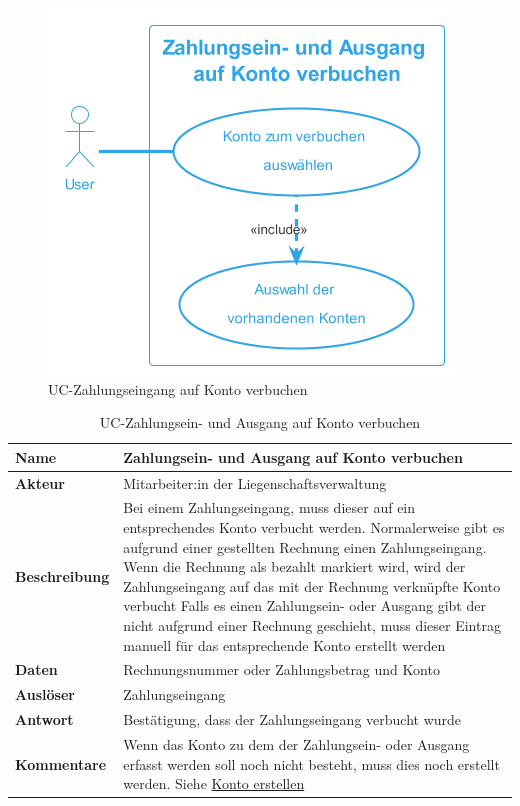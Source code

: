 \begin{figure}[H]
  \begin{center}
      \includegraphics[width=0.5\linewidth]{content/diagrams/out/usecase/verbuchenAufKonto/ZahlungseingangaufKontoverbuchen.png}
    \caption{UC-Zahlungseingang auf Konto verbuchen}
    \label{ZahlungaufKonto}
  \end{center}
\end{figure}

\begin{table}[H]
  \centering
  \settowidth{}
  \setlength\extrarowheight{2pt}
  \begin{tabulary}{1.0\textwidth}{|a|m{14cm}|}
    \hline
    \textbf{Name}& Zahlungsein- und Ausgang auf Konto verbuchen\\
    \hline
    \textbf{Akteur}& Mitarbeiter:in der Liegenschaftsverwaltung\\
    \hline 
    \textbf{Beschreibung} & Bei einem Zahlungseingang, muss dieser auf ein entsprechendes Konto verbucht werden. Normalerweise gibt es aufgrund einer gestellten Rechnung einen Zahlungseingang. Wenn die Rechnung als bezahlt markiert wird, wird der Zahlungseingang auf das mit der Rechnung verknüpfte Konto verbucht \newline
    Falls es einen Zahlungsein- oder Ausgang gibt der nicht aufgrund einer Rechnung geschieht, muss dieser Eintrag manuell für das entsprechende Konto erstellt werden\\
    \hline
    \textbf{Daten} & Rechnungsnummer oder Zahlungsbetrag und Konto\\
    \hline
    \textbf{Auslöser} & Zahlungseingang\\
    \hline
    \textbf{Antwort} & Bestätigung, dass der Zahlungseingang verbucht wurde\\
    \hline
    \textbf{Kommentare} & Wenn das Konto zu dem der Zahlungsein- oder Ausgang erfasst werden soll noch nicht besteht, muss dies noch erstellt werden. Siehe \hyperref[kontoErstellen]{Konto erstellen }\\
    \hline
  \end{tabulary}
  \caption{UC-Zahlungsein- und Ausgang auf Konto verbuchen}
\end{table}

